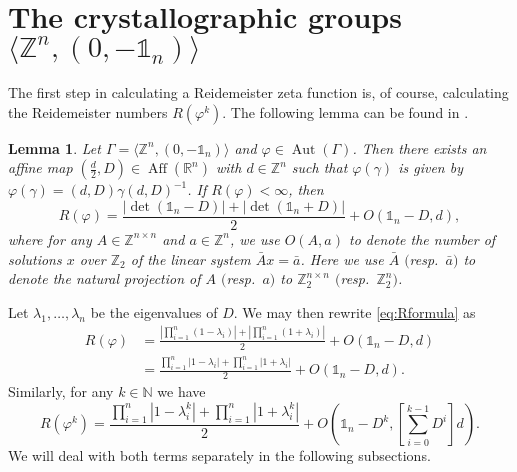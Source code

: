 \documentclass[a4paper]{article}
\theoremstyle{plain}
\newtheorem{lemma}[theorem]{Lemma}
\theoremstyle{definition}
\theoremstyle{remark}
\DeclareMathOperator{\Aut}{Aut}
\DeclareMathOperator{\Aff}{Aff}
\newcommand{\I}{\mathds{1}}
\newcommand{\NN}{{\mathbb{N}}}
\newcommand{\ZZ}{{\mathbb{Z}}}
\newcommand{\RR}{{\mathbb{R}}}
\begin{document}
\section{The crystallographic groups \(\langle \ZZ^n, (0,-\I_n)\rangle\)}
\label{sec:Zn0-1}
The first step in calculating a Reidemeister zeta function is, of course, calculating the Reidemeister numbers \(R(\varphi^k)\). The following lemma can be found in \cite[Proposition 5.10]{dkt17-2}.
\begin{lemma}\label{lemma.4.1}
	Let \(\Gamma = \langle \ZZ^n, (0,-\I_n)\rangle\) and \(\varphi \in \Aut(\Gamma)\). Then there exists an affine map \((\frac{d}{2}, D)\in \Aff(\RR^n)\) with \(d\in \ZZ^n\) such that \(\varphi(\gamma)\) is given by \(\varphi(\gamma) = (d,D)\gamma(d,D)^{-1}\). If \(R(\varphi) < \infty\), then
	\begin{equation}
	\label{eq:Rformula}
	R(\varphi) = \frac{|\det(\I_n - D)|+|\det(\I_n + D)|}{2} + O(\I_n - D,d),
	\end{equation}
	where for any \(A\in \ZZ^{n \times n}\) and \(a \in \ZZ^n\), we use \(O(A,a)\) to denote the number of solutions \(x\) over \(\ZZ_2\) of the linear system \(\bar{A}x = \bar{a}\). Here we use \(\bar{A}\)  $($resp.~$\bar{a})$ to denote the natural projection of \(A\) $($resp.~\(a)\) to \(\ZZ_2^{n \times n}\) $($resp.~$\ZZ_2^n)$.
\end{lemma}
Let \(\lambda_1, \dots, \lambda_n\) be the eigenvalues of \(D\). We may then rewrite \eqref{eq:Rformula} as
\begin{align*}
R(\varphi) &= \frac{\left|\prod_{i=1}^{n}(1-\lambda_i)\right|+\left|\prod_{i=1}^{n}(1+\lambda_i)\right|}{2} + O(\I_n - D,d)\\
&=\frac{\prod_{i=1}^{n}|1-\lambda_i|+\prod_{i=1}^{n}|1+\lambda_i|}{2} + O(\I_n - D,d).
\end{align*}
Similarly, for any \(k \in \NN\) we have
\begin{equation*}
R(\varphi^k) = \frac{\prod_{i=1}^{n}|1-\lambda_i^k|+\prod_{i=1}^{n}|1+\lambda_i^k|}{2} + O\left(\I_n-D^k,\left[\sum_{i=0}^{k-1}D^i\right] d\right).
\end{equation*}
We will deal with both terms separately in the following subsections.
\end{document}
